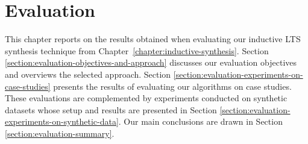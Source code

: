 \chapter{Evaluation\label{chapter:evaluation}}

This chapter reports on the results obtained when evaluating our inductive LTS synthesis technique from Chapter~\ref{chapter:inductive-synthesis}. Section \ref{section:evaluation-objectives-and-approach} discusses our evaluation objectives and overviews the selected approach. Section \ref{section:evaluation-experiments-on-case-studies} presents the results of evaluating our algorithms on case studies. These evaluations are complemented by experiments conducted on synthetic datasets whose setup and results are presented in Section \ref{section:evaluation-experiments-on-synthetic-data}. Our main conclusions are drawn in Section \ref{section:evaluation-summary}.





